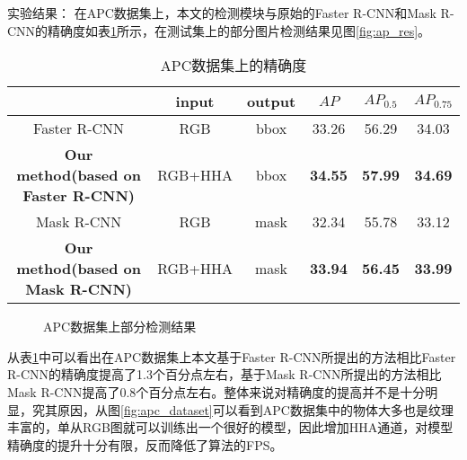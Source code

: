 {\kai 实验结果}：
在APC数据集上，本文的检测模块与原始的Faster R-CNN和Mask R-CNN的精确度如表\ref{tab:ap1}所示，在测试集上的部分图片检测结果见图\ref{fig:ap_res}。
\begin{table}[ht]
  \centering
  \caption{APC数据集上的精确度}
    \begin{tabular}{cccccc}
      \toprule
      &input&output&$AP$&$AP_{0.5}$&$AP_{0.75}$ \\
      \midrule
      Faster R-CNN&RGB&bbox&33.26&56.29&34.03 \\
      \bf{Our method(based on Faster R-CNN)}&RGB+HHA&bbox&\bf{34.55}&\bf{57.99}&\bf{34.69} \\
      Mask R-CNN&RGB&mask&32.34&55.78&33.12 \\
      \bf{Our method(based on Mask R-CNN)}&RGB+HHA&mask&\bf{33.94}&\bf{56.45}&\bf{33.99} \\
      \bottomrule
    \end{tabular}
  \label{tab:ap1}
\end{table}
\begin{figure}[ht]
  \centering
  \hskip2pt
  \hskip2pt
  \caption{APC数据集上部分检测结果}
  \label{fig:apc_res}
\end{figure}
从表\ref{tab:ap1}中可以看出在APC数据集上本文基于Faster R-CNN所提出的方法相比Faster R-CNN的精确度提高了1.3个百分点左右，基于Mask R-CNN所提出的方法相比Mask R-CNN提高了0.8个百分点左右。整体来说对精确度的提高并不是十分明显，究其原因，从图\ref{fig:apc_dataset}可以看到APC数据集中的物体大多也是纹理丰富的，单从RGB图就可以训练出一个很好的模型，因此增加HHA通道，对模型精确度的提升十分有限，反而降低了算法的FPS。

